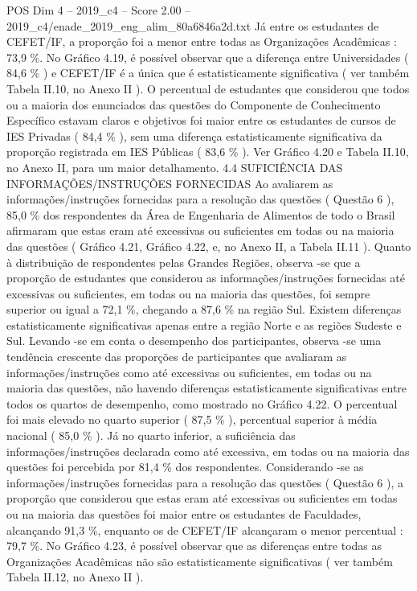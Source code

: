 \begin{textsample}{POS Dim 4 – 2019\_c4 – Score 2.00 – 2019\_c4/enade\_2019\_eng\_alim\_80a6846a2d.txt}
Já entre os estudantes de CEFET/IF, a proporção foi a menor entre todas as Organizações Acadêmicas : 73,9 \%.
No Gráfico 4.19, é possível observar que a diferença entre Universidades ( 84,6 \% ) e CEFET/IF é a única que é estatisticamente significativa ( ver também Tabela II.10, no Anexo II ).
O percentual de estudantes que considerou que todos ou a maioria dos enunciados das questões do Componente de Conhecimento Específico estavam claros e objetivos foi maior entre os estudantes de cursos de IES Privadas ( 84,4 \% ), sem uma diferença estatisticamente significativa da proporção registrada em IES Públicas ( 83,6 \% ).
Ver Gráfico 4.20 e Tabela II.10, no Anexo II, para um maior detalhamento. 4.4 SUFICIÊNCIA DAS INFORMAÇÕES/INSTRUÇÕES FORNECIDAS Ao avaliarem as informações/instruções fornecidas para a resolução das questões ( Questão 6 ), 85,0 \% dos respondentes da Área de Engenharia de Alimentos de todo o Brasil afirmaram que estas eram até excessivas ou suficientes em todas ou na maioria das questões ( Gráfico 4.21, Gráfico 4.22, e, no Anexo II, a Tabela II.11 ).
Quanto à distribuição de respondentes pelas Grandes Regiões, observa -se que a proporção de estudantes que considerou as informações/instruções fornecidas até excessivas ou suficientes, em todas ou na maioria das questões, foi sempre superior ou igual a 72,1 \%, chegando a 87,6 \% na região Sul.
Existem diferenças estatisticamente significativas apenas entre a região Norte e as regiões Sudeste e Sul.
Levando -se em conta o desempenho dos participantes, observa -se uma tendência crescente das proporções de participantes que avaliaram as informações/instruções como até excessivas ou suficientes, em todas ou na maioria das questões, não havendo diferenças estatisticamente significativas entre todos os quartos de desempenho, como mostrado no Gráfico 4.22.
O percentual foi mais elevado no quarto superior ( 87,5 \% ), percentual superior à média nacional ( 85,0 \% ).
Já no quarto inferior, a suficiência das informações/instruções declarada como até excessiva, em todas ou na maioria das questões foi percebida por 81,4 \% dos respondentes.
Considerando -se as informações/instruções fornecidas para a resolução das questões ( Questão 6 ), a proporção que considerou que estas eram até excessivas ou suficientes em todas ou na maioria das questões foi maior entre os estudantes de Faculdades, alcançando 91,3 \%, enquanto os de CEFET/IF alcançaram o menor percentual : 79,7 \%.
No Gráfico 4.23, é possível observar que as diferenças entre todas as Organizações Acadêmicas não são estatisticamente significativas ( ver também Tabela II.12, no Anexo II ).

\end{textsample}
